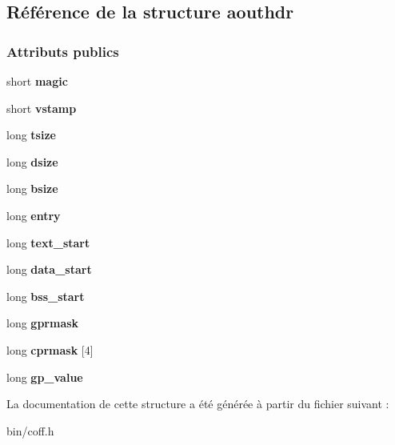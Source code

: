 \hypertarget{structaouthdr}{}\subsection{Référence de la structure aouthdr}
\label{structaouthdr}
\subsubsection*{Attributs publics}
\begin{DoxyCompactItemize}
\item 
\hypertarget{structaouthdr_ace237852270c094dd4185f49963181a9}{}\label{structaouthdr_ace237852270c094dd4185f49963181a9} 
short {\bfseries magic}
\item 
\hypertarget{structaouthdr_acdecb20803a0e10aa4fdb6a844267c74}{}\label{structaouthdr_acdecb20803a0e10aa4fdb6a844267c74} 
short {\bfseries vstamp}
\item 
\hypertarget{structaouthdr_a6368090c383d0c441c40b49c316219b0}{}\label{structaouthdr_a6368090c383d0c441c40b49c316219b0} 
long {\bfseries tsize}
\item 
\hypertarget{structaouthdr_a1eb7a64f2d2d5e341efdf54dd3636a7a}{}\label{structaouthdr_a1eb7a64f2d2d5e341efdf54dd3636a7a} 
long {\bfseries dsize}
\item 
\hypertarget{structaouthdr_a294f1e4edb798c4c67f95cec9f015a66}{}\label{structaouthdr_a294f1e4edb798c4c67f95cec9f015a66} 
long {\bfseries bsize}
\item 
\hypertarget{structaouthdr_aedc4907be0951b0103460335d55075af}{}\label{structaouthdr_aedc4907be0951b0103460335d55075af} 
long {\bfseries entry}
\item 
\hypertarget{structaouthdr_acabcb1b1d04ab0b6f42c1d7319beaea4}{}\label{structaouthdr_acabcb1b1d04ab0b6f42c1d7319beaea4} 
long {\bfseries text\+\_\+start}
\item 
\hypertarget{structaouthdr_a759d5be21871df26f138c2b93190f297}{}\label{structaouthdr_a759d5be21871df26f138c2b93190f297} 
long {\bfseries data\+\_\+start}
\item 
\hypertarget{structaouthdr_a5f6556d5e3544741b5b3d1abcd0cdf45}{}\label{structaouthdr_a5f6556d5e3544741b5b3d1abcd0cdf45} 
long {\bfseries bss\+\_\+start}
\item 
\hypertarget{structaouthdr_ada9d272dee968d6d4b4497d51375b9b6}{}\label{structaouthdr_ada9d272dee968d6d4b4497d51375b9b6} 
long {\bfseries gprmask}
\item 
\hypertarget{structaouthdr_a5fc6f6354180a92e18781a4524407b01}{}\label{structaouthdr_a5fc6f6354180a92e18781a4524407b01} 
long {\bfseries cprmask} \mbox{[}4\mbox{]}
\item 
\hypertarget{structaouthdr_abab379e486fe7d8ff3793fd098aa99be}{}\label{structaouthdr_abab379e486fe7d8ff3793fd098aa99be} 
long {\bfseries gp\+\_\+value}
\end{DoxyCompactItemize}


La documentation de cette structure a été générée à partir du fichier suivant \+:\begin{DoxyCompactItemize}
\item 
bin/coff.\+h\end{DoxyCompactItemize}
